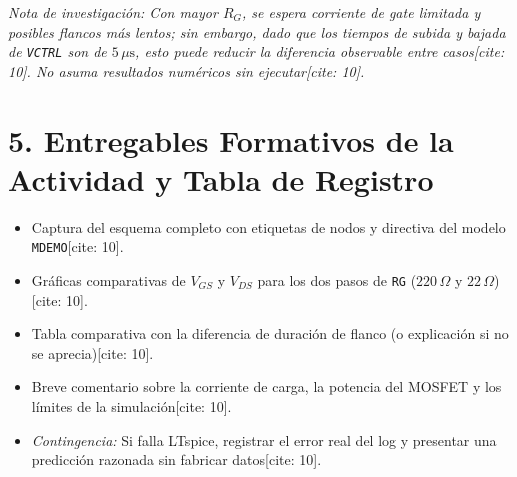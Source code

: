 \documentclass[11pt, a4paper]{article}
\begin{document}
\begin{center}
\end{center}
\textit{Nota de investigación: Con mayor $R_G$, se espera corriente de gate limitada y posibles flancos más lentos; sin embargo, dado que los tiempos de subida y bajada de \texttt{VCTRL} son de $5\,\mu\text{s}$, esto puede reducir la diferencia observable entre casos[cite: 10]. No asuma resultados numéricos sin ejecutar[cite: 10].}

\section*{5. Entregables Formativos de la Actividad y Tabla de Registro}
\begin{itemize}[noitemsep]
    \item Captura del esquema completo con etiquetas de nodos y directiva del modelo \texttt{MDEMO}[cite: 10].
    \item Gráficas comparativas de $V_{GS}$ y $V_{DS}$ para los dos pasos de \texttt{RG} ($220\,\Omega$ y $22\,\Omega$)[cite: 10].
    \item Tabla comparativa con la diferencia de duración de flanco (o explicación si no se aprecia)[cite: 10].
    \item Breve comentario sobre la corriente de carga, la potencia del MOSFET y los límites de la simulación[cite: 10].
    \item \textit{Contingencia:} Si falla LTspice, registrar el error real del log y presentar una predicción razonada sin fabricar datos[cite: 10].
\end{itemize}
\end{document}
